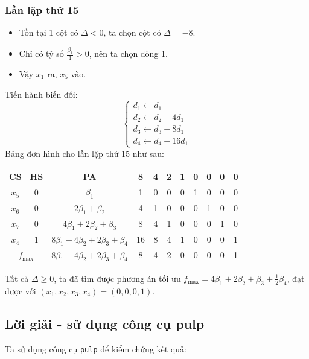 \documentclass[12pt]{article}
\begin{document}
\subsubsection{Lần lặp thứ 15}
\begin{itemize}
\item Tồn tại 1 cột có $\Delta < 0$, ta chọn cột có $\Delta = -8$.
\item Chỉ có tỷ số $\displaystyle \frac{\beta_1}{1} > 0$, nên ta chọn dòng 1.
\item Vậy $x_1$ ra, $x_5$ vào.
\end{itemize}
Tiến hành biến đổi:
$$
\left\{
\begin{array}{lll}
d_1 \leftarrow d_1 \\
d_2 \leftarrow d_2 + 4d_1\\
d_3 \leftarrow d_3 + 8d_1\\
d_4 \leftarrow d_4 + 16d_1
\end{array}
\right.
$$
Bảng đơn hình cho lần lặp thứ 15 như sau:
\begin{table}[H]
\centering
\begin{tabular}{|c|c|c|c|c|c|c|c|c|c|c|}
\hline
CS & HS & PA & 8 & 4 & 2 & 1 & 0 & 0 & 0 & 0 \\
\hline
$x_5$ & 0 & $\beta_1$ & 1 & 0 & 0 & 0 & 1 & 0 & 0 & 0 \\
$x_6$ & 0 & $2\beta_1 + \beta_2$ & 4 & 1 & 0 & 0 & 0 & 1 & 0 & 0 \\
$x_7$ & 0 & $4\beta_1 + 2\beta_2 + \beta_3$ & 8 & 4 & 1 & 0 & 0 & 0 & 1 & 0 \\
$x_4$ & 1 & $8\beta_1 + 4\beta_2 + 2\beta_3 + \beta_4$ & 16 & 8 & 4 & 1 & 0 & 0 & 0 & 1 \\
\hline
\multicolumn{2}{|c|}{$f_{\max}$}
& $8\beta_1 + 4\beta_2 + 2\beta_3 + \beta_4$ & 8 & 4 & 2 & 0 & 0 & 0 & 0 & 1 \\
\hline
\end{tabular}
\end{table}
\noindent Tất cả $\Delta \geq 0$, ta đã tìm được phương án tối ưu $\displaystyle f_{\max} = 4\beta_1 + 2\beta_2 + \beta_3 + \frac{1}{2}\beta_4$, đạt được với $(x_1, x_2, x_3, x_4) = (0, 0, 0, 1)$.

\subsection{Lời giải - sử dụng công cụ pulp}
Ta sử dụng công cụ \texttt{pulp} để kiểm chứng kết quả:
\end{document}
